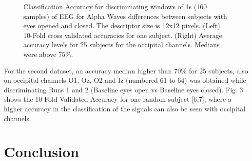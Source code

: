 \begin{figure}[h!]
\centering
{}
\caption[Alpha Waves Classification]{Classification Accuracy for discriminating windows of 1s (160 samples) of EEG for Alpha Waves differences between subjects with eyes opened and closed. The descriptor size is 12x12 pixels. (Left) 10-Fold cross validated accuracies for one subject.  (Right) Average accuracy levels for 25 subjects for the occipital channels. Medians were above $75\%$.}
\label{fig:alpharesults}
\end{figure}


For the second dataset, an accuracy median higher than $70\%$ for 25 subjects, also on occipital channels O1, Oz, O2 and Iz (numbered 61 to 64) was obtained while discriminating Runs 1 and 2 (Baseline eyes open vs Baseline eyes closed). Fig. 3 shows the 10-Fold Validated Accuracy for one random subject [6,7], where a higher accuracy in the classification of the signals can also be seen with occipital channels.  

\section{Conclusion}

